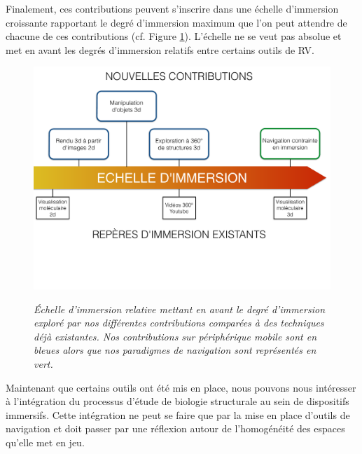 Finalement, ces contributions peuvent s'inscrire dans une échelle d'immersion croissante rapportant le degré d'immersion maximum que l'on peut attendre de chacune de ces contributions (cf. Figure \ref{Fig:immersion_scale}). L'échelle ne se veut pas absolue et met en avant les degrés d'immersion relatifs entre certains outils de RV.

\begin{figure}[h]
  \centering
  {\includegraphics[width=.75\linewidth]{./figures/ch3/immersion_scale.pdf}}
    \caption[Échelle d'immersion dans laquelle s'inscrivent nos contributions.]{{\it Échelle d'immersion relative mettant en avant le degré d'immersion exploré par nos différentes contributions comparées à des techniques déjà existantes. Nos contributions sur périphérique mobile sont en bleues alors que nos paradigmes de navigation sont représentés en vert.}}
  \label{Fig:immersion_scale}
\end{figure}

Maintenant que certains outils ont été mis en place, nous pouvons nous intéresser à l'intégration du processus d'étude de biologie structurale au sein de dispositifs immersifs. Cette intégration ne peut se faire que par la mise en place d'outils de navigation et doit passer par une réflexion autour de l'homogénéité des espaces qu'elle met en jeu.